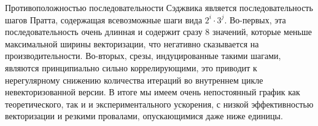 Противоположностью последовательности Сэджвика является последовательность шагов Пратта, содержащая всевозможные шаги вида $2^i \cdot 3^j$.
Во-первых, эта последовательность очень длинная и содержит сразу 8 значений, которые меньше максимальной ширины векторизации, что негативно сказывается на производительности.
Во-вторых, срезы, индуцированные такими шагами, являются принципиально сильно коррелирующими, это приводит к нерегулярному снижению количества итераций во внутреннем цикле невекторизованной версии.
В итоге мы имеем очень непостоянный график как теоретического, так и и экспериментального ускорения, с низкой эффективностью векторизации\label{term:vec_eff6} и резкими провалами, опускающимися даже ниже единицы.

